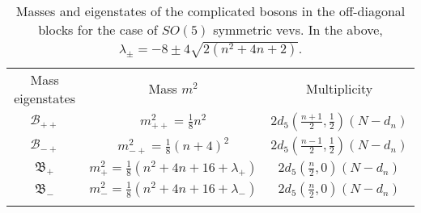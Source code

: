 \begin{table}
%
\begin{center}
%
\begingroup
\setlength{\tabcolsep}{10pt} %
\renewcommand{\arraystretch}{2.0} %
%
\begin{tabular}{ !{\vrule width 1.5pt}c!{\vrule width 1.5pt}c!{\vrule width 1.5pt}c!{\vrule width 1.5pt} }
 	Mass eigenstates & Mass $m^2$ & Multiplicity \\
 	$\mathcal{B}_{++}$ & $m^2_{++} = \frac{1}{8} n^2$ & $2 d_5 \left(\frac{n+1}{2}, \tfrac{1}{2} \right) (N - d_n)$ \\
 	\hline
 	$\mathcal{B}_{-+}$ & $m^2_{-+} = \frac{1}{8} (n+4)^2$ & $2 d_5 \left(\frac{n-1}{2}, \tfrac{1}{2} \right) (N - d_n)$ \\
 	\hline
 	$\mathfrak{B}_+$ & $m^2_+ = \frac{1}{8} (n^2 + 4 n + 16 + \lambda_+)$ & $2 d_5 \left(\frac{n}{2}, 0 \right) (N - d_n)$ \\
 	\hline
 	$\mathfrak{B}_-$ & $m^2_- = \frac{1}{8} (n^2 + 4 n + 16 + \lambda_-)$ & $2 d_5 \left(\frac{n}{2}, 0 \right) (N - d_n)$ \\
\end{tabular}
%
\endgroup
%
\end{center}
%
\caption[Masses and eigenstates for $SO(5)$ comp. bosons: off-diag. blocks]{Masses and eigenstates of the complicated bosons in the off-diagonal blocks for the case of $SO(5)$ symmetric vevs. In the above, $\lambda_{\pm} = -8 \pm 4 \sqrt{2 (n^2 + 4 n + 2)}$.}
%
\label{tab:boson_masses_complicated_so(5)_off-diagonal}
%
\end{table}
%
%

